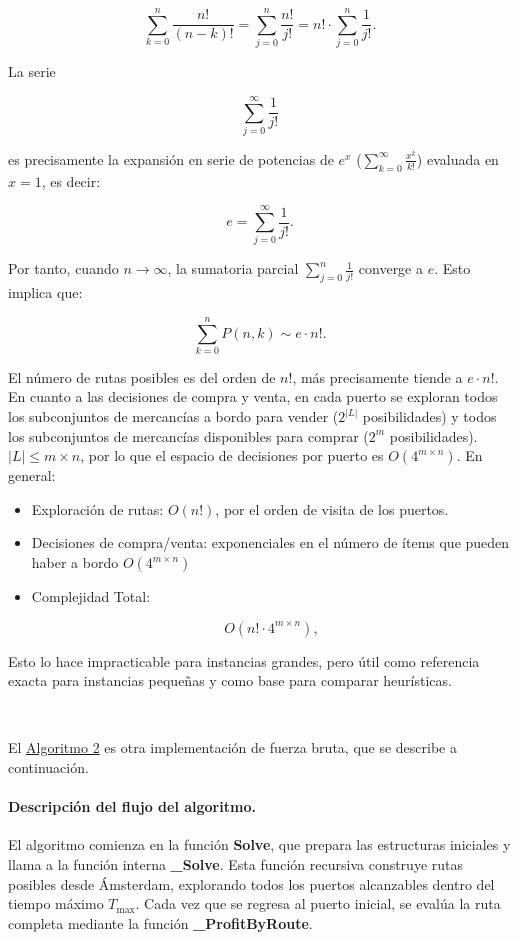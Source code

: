 \documentclass[12pt, a4paper]{article}
\begin{document}
\[
\sum_{k=0}^{n} \frac{n!}{(n-k)!} = \sum_{j=0}^{n} \frac{n!}{j!} = n! \cdot \sum_{j=0}^{n} \frac{1}{j!}.
\]


La serie


\[
\sum_{j=0}^{\infty} \frac{1}{j!}
\]


es precisamente la expansión en serie de potencias de $e^x$ ($\sum_{k=0}^{\infty} \frac{x^k}{k!}$) evaluada en $x=1$, es decir:


\[
e = \sum_{j=0}^{\infty} \frac{1}{j!}.
\]



Por tanto, cuando $n \to \infty$, la sumatoria parcial $\sum_{j=0}^{n} \tfrac{1}{j!}$ converge a $e$. Esto implica que:


\[
\sum_{k=0}^{n} P(n,k) \sim e \cdot n!.
\]


El número de rutas posibles es del orden de $n!$, más precisamente tiende a $e \cdot n!$. En cuanto a las decisiones de compra y venta, en cada puerto se exploran todos los subconjuntos de mercancías a bordo para vender ($2^{|L|}$ posibilidades) y todos los subconjuntos de mercancías disponibles para comprar ($2^m$ posibilidades). 
$|L| \leq m \times n$, por lo que el espacio de decisiones por puerto es $O(4^{m \times n})$.
En general:
\begin{itemize}
    \item Exploración de rutas: $O(n!)$, por el orden de visita de los puertos.
    \item Decisiones de compra/venta: exponenciales en el número de ítems que pueden haber a bordo $O(4^{m \times n})$
    \item Complejidad Total: 
    

\[
    O\!\left(n! \cdot 4^{m \times n}\right),
    \]
\end{itemize}



Esto lo hace impracticable para instancias grandes, pero útil como referencia exacta para instancias pequeñas y como base para comparar heurísticas.

\

El \hyperref[alg:chp]{Algoritmo 2} es otra implementación de fuerza bruta, que se describe a continuación.

\paragraph{Descripción del flujo del algoritmo.}
El algoritmo comienza en la función \textbf{Solve}, que prepara las estructuras iniciales y llama a la función interna \textbf{\_Solve}. 
Esta función recursiva construye rutas posibles desde Ámsterdam, explorando todos los puertos alcanzables dentro del tiempo máximo $T_{\max}$. 
Cada vez que se regresa al puerto inicial, se evalúa la ruta completa mediante la función \textbf{\_ProfitByRoute}.
\end{document}
